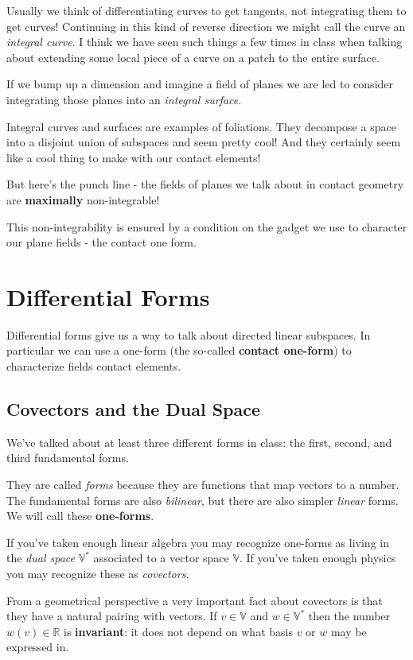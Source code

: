 \documentclass{article}
\theoremstyle{definition}
\begin{document}
Usually we think of differentiating curves to get tangents, not integrating them
to get curves! Continuing in this kind of reverse direction we might call the curve an
\textit{integral curve}. I think we have seen such things a few times in class when
talking about extending some local piece of a curve on a patch to the entire surface.

If we bump up a dimension and imagine a field of planes we are led to consider
integrating those planes into an \textit{integral surface}.

Integral curves and surfaces are examples of foliations. They decompose a space
into a disjoint union of subspaces and seem pretty cool! And they certainly seem
like a cool thing to make with our contact elements!

But here's the punch line - the fields of planes we talk about in contact
geometry are \textbf{maximally} non-integrable!

This non-integrability is ensured by a condition on the gadget we use to
character our plane fields - the contact one form.

\section {Differential Forms}

Differential forms give us a way to talk about directed linear subspaces. In
particular we can use a one-form (the so-called \textbf{contact one-form}) to
characterize fields contact elements.

\subsection{Covectors and the Dual Space}
We've talked about at least three different forms in class: the first, second,
and third fundamental forms.

They are called \textit{forms} because they are functions that map vectors to a
number. The fundamental forms are also \textit{bilinear}, but there are also simpler
\textit{linear} forms. We will call these \textbf{one-forms}.

If you've taken enough linear algebra you may recognize one-forms as living in
the \textit{dual space} $\mathbb{V}^{*}$ associated to a vector space
$\mathbb{V}$. If you've taken enough physics you may recognize these as \textit{covectors}.

From a geometrical perspective a very important fact about covectors is that
they have a natural pairing with vectors. If $v \in \mathbb{V}$ and $w \in \mathbb{V}^{*}$ then the number $w(v) \in
\mathbb{R}$ is \textbf{invariant}: it does not depend on what basis $v$ or $w$
may be expressed in.
\end{document}
